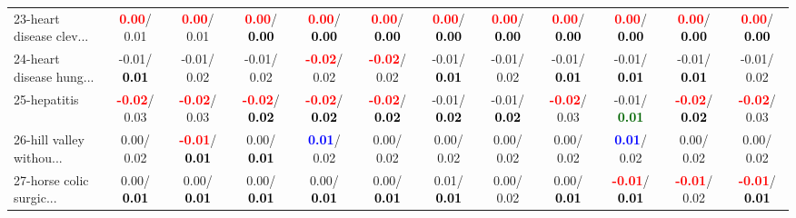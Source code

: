 \begin{table}[h]
\begin{center}
{\begin{tabular}{lc|c|c|c|c|c|c|c|c|c|c}
23-heart disease clev... & \textcolor{red}{\textbf{  0.00}}/  0.01 & \textcolor{red}{\textbf{  0.00}}/  0.01 & \textcolor{red}{\textbf{  0.00}}/\textcolor{black}{\textbf{  0.00}} & \textcolor{red}{\textbf{  0.00}}/\textcolor{black}{\textbf{  0.00}} & \textcolor{red}{\textbf{  0.00}}/\textcolor{black}{\textbf{  0.00}} & \textcolor{red}{\textbf{  0.00}}/\textcolor{black}{\textbf{  0.00}} & \textcolor{red}{\textbf{  0.00}}/\textcolor{black}{\textbf{  0.00}} & \textcolor{red}{\textbf{  0.00}}/\textcolor{black}{\textbf{  0.00}} & \textcolor{red}{\textbf{  0.00}}/\textcolor{black}{\textbf{  0.00}} & \textcolor{red}{\textbf{  0.00}}/\textcolor{black}{\textbf{  0.00}} & \textcolor{red}{\textbf{  0.00}}/\textcolor{black}{\textbf{  0.00}} \\
24-heart disease hung... &  -0.01/\textcolor{black}{\textbf{  0.01}} &  -0.01/  0.02 &  -0.01/  0.02 & \textcolor{red}{\textbf{ -0.02}}/  0.02 & \textcolor{red}{\textbf{ -0.02}}/  0.02 &  -0.01/\textcolor{black}{\textbf{  0.01}} &  -0.01/  0.02 &  -0.01/\textcolor{black}{\textbf{  0.01}} &  -0.01/\textcolor{black}{\textbf{  0.01}} &  -0.01/\textcolor{black}{\textbf{  0.01}} &  -0.01/  0.02 \\
25-hepatitis & \textcolor{red}{\textbf{ -0.02}}/  0.03 & \textcolor{red}{\textbf{ -0.02}}/  0.03 & \textcolor{red}{\textbf{ -0.02}}/\textcolor{black}{\textbf{  0.02}} & \textcolor{red}{\textbf{ -0.02}}/\textcolor{black}{\textbf{  0.02}} & \textcolor{red}{\textbf{ -0.02}}/\textcolor{black}{\textbf{  0.02}} &  -0.01/\textcolor{black}{\textbf{  0.02}} &  -0.01/\textcolor{black}{\textbf{  0.02}} & \textcolor{red}{\textbf{ -0.02}}/  0.03 &  -0.01/\textcolor{darkgreen}{\textbf{  0.01}} & \textcolor{red}{\textbf{ -0.02}}/\textcolor{black}{\textbf{  0.02}} & \textcolor{red}{\textbf{ -0.02}}/  0.03 \\
26-hill valley withou... &   0.00/  0.02 & \textcolor{red}{\textbf{ -0.01}}/\textcolor{black}{\textbf{  0.01}} &   0.00/\textcolor{black}{\textbf{  0.01}} & \textcolor{blue}{\textbf{  0.01}}/  0.02 &   0.00/  0.02 &   0.00/  0.02 &   0.00/  0.02 &   0.00/  0.02 & \textcolor{blue}{\textbf{  0.01}}/  0.02 &   0.00/  0.02 &   0.00/  0.02 \\
27-horse colic surgic... &   0.00/\textcolor{black}{\textbf{  0.01}} &   0.00/\textcolor{black}{\textbf{  0.01}} &   0.00/\textcolor{black}{\textbf{  0.01}} &   0.00/\textcolor{black}{\textbf{  0.01}} &   0.00/\textcolor{black}{\textbf{  0.01}} &   0.01/\textcolor{black}{\textbf{  0.01}} &   0.00/  0.02 &   0.00/\textcolor{black}{\textbf{  0.01}} & \textcolor{red}{\textbf{ -0.01}}/\textcolor{black}{\textbf{  0.01}} & \textcolor{red}{\textbf{ -0.01}}/  0.02 & \textcolor{red}{\textbf{ -0.01}}/\textcolor{black}{\textbf{  0.01}} \\

\end{tabular}}
\end{center}
\end{table}
